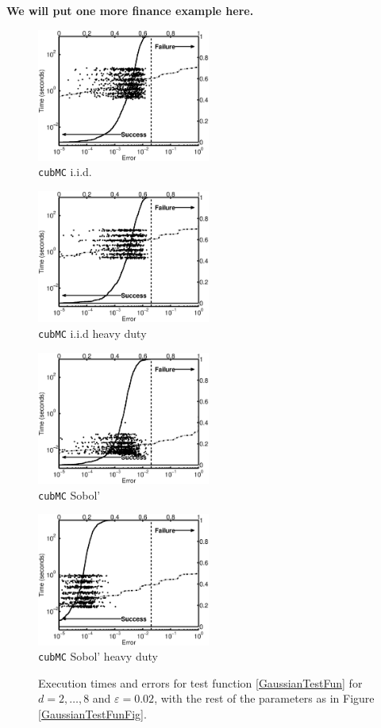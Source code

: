 \documentclass[graybox]{svmult}
\begin{document}
{\bf We will put one more finance example here.}


\begin{figure}
\centering
\begin{minipage}{5.7cm} \centering \includegraphics[width=5.7cm]{geomeaniidErrTime.eps} \\ {\tt cubMC} i.i.d. \end{minipage}
\begin{minipage}{5.7cm} \centering \includegraphics[width=5.7cm]{geomeaniidheavyErrTime.eps} \\ {\tt cubMC} i.i.d heavy duty \end{minipage}
\begin{minipage}{5.7cm} \centering \includegraphics[width=5.7cm]{geomeanSobolErrTime.eps} \\ {\tt cubMC} Sobol' \end{minipage}
\begin{minipage}{5.7cm} \centering \includegraphics[width=5.7cm]{geomeanSobolheavyErrTime.eps} \\ {\tt cubMC} Sobol' heavy duty \end{minipage}
\caption{Execution times and errors for test function \eqref{GaussianTestFun} for $d=2, \ldots, 8$ and $\varepsilon=0.02$, with the rest of the parameters as in Figure \ref{GaussianTestFunFig}.\label{GaussianTestFunHDFig}}
\end{figure}
\end{document}
